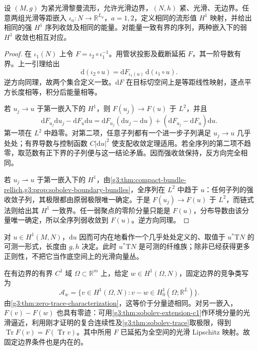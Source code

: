 \begin{proposition}\label{g3:prop:sobolev-map-embedding-independence}
	设 \((M,g)\) 为紧光滑黎曼流形，允许光滑边界，\((N,h)\) 紧、光滑、无边界。任意两组光滑等距嵌入 \(\iota_a:N\to\mathbb R^{L_a}\)，\(a=1,2\)，定义相同的流形值 \(H^1\) 映射，并给出相同的强 \(H^1\) 序列收敛及相同的能量。对能量一致有界的序列，两种嵌入下的弱 \(H^1\) 收敛也相互对应。
\end{proposition}
\begin{proof}
	在 \(\iota_1(N)\) 上令 \(F=\iota_2\circ\iota_1^{-1}\)。用管状投影及截断延拓 \(F\)，其一阶导数有界。上一引理给出
	\[
		\mathrm d(\iota_2\circ u)=\mathrm dF_{\iota_1(u)}\,\mathrm d(\iota_1\circ u).
	\]
	逆方向同理，故两个集合定义一致。\(\mathrm dF\) 在目标切空间上是等距线性映射，逐点平方长度相等，积分后能量相等。

	若 \(u_j\to u\) 于第一嵌入下的 \(H^1\)，则 \(F(u_j)\to F(u)\) 于 \(L^2\)，并且
	\[
		\mathrm dF_{u_j}\mathrm du_j-\mathrm dF_u\mathrm du
		=\mathrm dF_{u_j}(\mathrm du_j-\mathrm du)
		 +(\mathrm dF_{u_j}-\mathrm dF_u)\mathrm du.
	\]
	第一项在 \(L^2\) 中趋零。对第二项，任意子列都有一个进一步子列满足 \(u_j\to u\) 几乎处处；有界导数与控制函数 \(C|\mathrm du|^2\) 使支配收敛定理适用。若全序列的第二项不趋零，取范数有正下界的子列便与这一结论矛盾。因而强收敛保持，反方向完全相同。

	若 \(u_j\rightharpoonup u\) 于第一嵌入下的 \(H^1\)，由\cref{g3:thm:compact-bundle-rellich,g3:prop:sobolev-boundary-bundles}，全序列在 \(L^2\) 中趋于 \(u\)：任何子列的强收敛子列，其极限都由原弱极限唯一确定。于是 \(F(u_j)\to F(u)\) 于 \(L^2\)，而链式法则给出其 \(H^1\) 一致界。任一弱聚点的零阶分量只能是 \(F(u)\)，分布导数由该分量唯一确定，所以全序列弱收敛到 \(F(u)\)。逆方向同理。
\end{proof}

对 \(u\in H^1(M,N)\)，\(\mathrm du\) 因而可内在地看作一个几乎处处定义的、取值于 \(u^*\mathrm TN\) 的可测一形式，长度由 \(g,h\) 决定。此时 \(u^*\mathrm TN\) 是可测的纤维族；除非已经获得更多正则性，不把它当作底空间上的光滑向量丛。

\ProseParagraphBreak

在有边界的有界 \(C^1\) 域 \(\Omega\subset\mathbb R^m\) 上，给定 \(w\in H^1(\Omega,N)\)，固定边界的竞争类写为
\begin{equation}\label{g3:eq:harmonic-map-trace-class}
	\mathcal A_w=\{v\in H^1(\Omega,N):v-w\in H^1_0(\Omega;\mathbb R^L)\}.
\end{equation}
由\cref{g3:thm:zero-trace-characterization}，这等价于分量迹相同。对另一嵌入，\(F(v)-F(w)\) 也具有零迹：可用\cref{g3:thm:sobolev-extension-c1}作环境分量的光滑逼近，利用刚才证明的复合连续性及\cref{g3:thm:sobolev-trace}取极限，得到 \(\operatorname{Tr}F(v)=F(\operatorname{Tr}v)\)。其中所用 \(F\) 已延拓为全空间的光滑 Lipschitz 映射。故固定边界条件也是内在的。

